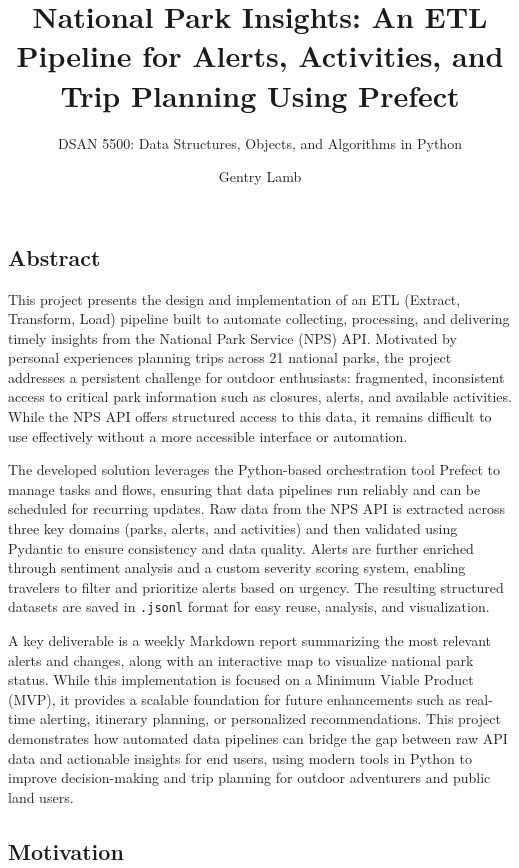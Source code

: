 \documentclass[
  letterpaper,
  DIV=11,
  numbers=noendperiod]{scrartcl}
\title{National Park Insights: An ETL Pipeline for Alerts, Activities,
and Trip Planning Using Prefect}
\subtitle{DSAN 5500: Data Structures, Objects, and Algorithms in Python}
\author{Gentry Lamb}
\date{}
\begin{document}
\maketitle


\subsection{Abstract}\label{abstract}

This project presents the design and implementation of an ETL (Extract,
Transform, Load) pipeline built to automate collecting, processing, and
delivering timely insights from the National Park Service (NPS) API.
Motivated by personal experiences planning trips across 21 national
parks, the project addresses a persistent challenge for outdoor
enthusiasts: fragmented, inconsistent access to critical park
information such as closures, alerts, and available activities. While
the NPS API offers structured access to this data, it remains difficult
to use effectively without a more accessible interface or automation.

The developed solution leverages the Python-based orchestration tool
Prefect to manage tasks and flows, ensuring that data pipelines run
reliably and can be scheduled for recurring updates. Raw data from the
NPS API is extracted across three key domains (parks, alerts, and
activities) and then validated using Pydantic to ensure consistency and
data quality. Alerts are further enriched through sentiment analysis and
a custom severity scoring system, enabling travelers to filter and
prioritize alerts based on urgency. The resulting structured datasets
are saved in \texttt{.jsonl} format for easy reuse, analysis, and
visualization.

A key deliverable is a weekly Markdown report summarizing the most
relevant alerts and changes, along with an interactive map to visualize
national park status. While this implementation is focused on a Minimum
Viable Product (MVP), it provides a scalable foundation for future
enhancements such as real-time alerting, itinerary planning, or
personalized recommendations. This project demonstrates how automated
data pipelines can bridge the gap between raw API data and actionable
insights for end users, using modern tools in Python to improve
decision-making and trip planning for outdoor adventurers and public
land users.

\subsection{Motivation}\label{motivation}
\end{document}
